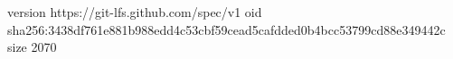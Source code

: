 version https://git-lfs.github.com/spec/v1
oid sha256:3438df761e881b988edd4c53cbf59cead5cafdded0b4bcc53799cd88e349442c
size 2070

